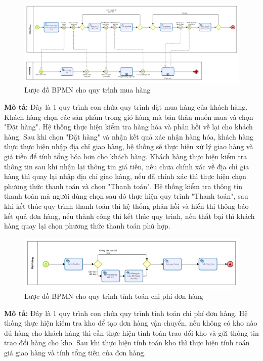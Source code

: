     \begin{figure}[!htp]
        \centering
        \includegraphics[width=15cm]{img/BPMN/customer_buy/customer_buy_order.png}
        \newline
        \caption{Lược đồ BPMN cho quy trình mua hàng}
    \end{figure}
    \textbf{Mô tả:} Đây là 1 quy trình con chứa quy trình đặt mua hàng của khách hàng. Khách hàng chọn các sản phẩm trong giỏ hàng mà bản thân muốn mua và chọn "Đặt hàng". Hệ thống thực hiện kiểm tra hàng hóa và phản hồi về lại cho khách hàng. Sau khi chọn "Đặt hàng" và nhận kết quả xác nhận hàng hóa, khách hàng thực thực hiện nhập địa chỉ giao hàng, hệ thống sẽ thực hiện xử lý giao hàng và giá tiền để tính tổng hóa hơn cho khách hàng. Khách hàng thực hiện kiểm tra thông tin sau khi nhận lại thông tin giá tiền, nếu chưa chính xác về địa chỉ gia hàng thì quay lại nhập địa chỉ giao hàng, nếu đã chính xác thì thực hiện chọn phương thức thanh toán và chọn "Thanh toán". Hệ thống kiểm tra thông tin thanh toán mà người dùng chọn sau đó thực hiện quy trình "Thanh toán", sau khi kết thúc quy trình thanh toán thì hệ thống phản hồi và hiển thị thông báo kết quả đơn hàng, nếu thành công thì kết thúc quy trình, nếu thất bại thì khách hàng quay lại chọn phương thức thanh toán phù hợp.
 
    \begin{figure}[!htp]
        \centering
        \includegraphics[width=5in]{img/BPMN/customer_buy/customer_calc_fee.png}
        \newline
        \caption{Lược đồ BPMN cho quy trình tính toán chi phí đơn hàng}
    \end{figure}
    \textbf{Mô tả:} Đây là 1 quy trình con chứa quy trình tính toán chi phí đơn hàng. Hệ thống thực hiện kiểm tra kho để tạo đơn hàng vận chuyển, nếu không có kho nào đủ hàng cho khách hàng thì cần thực hiện tính toán trao đổi kho và gửi thông tin trao đổi hàng cho kho. Sau khi thực hiện tính toán kho thì thực hiện tính toán giá giao hàng và tính tổng tiền của đơn hàng.
 
